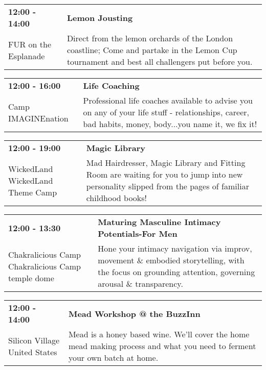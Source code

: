 \begin{tabular}{ p{1in} p{2.2in} }
    \textbf{12:00 - 14:00} & \textbf{Lemon Jousting} \\
    FUR \newline 6.45 on the Esplanade & Direct from the lemon orchards of the London coastline;  Come and partake in the Lemon Cup tournament and best all challengers put before you. \\
    \hline 
\end{tabular}
    
\begin{tabular}{ p{1in} p{2.2in} }
    \textbf{12:00 - 16:00} & \textbf{Life Coaching} \\
    Camp IMAGINEnation \newline  & Professional life coaches available to advise you on any of your life stuff - relationships, career, bad habits, money, body...you name it, we fix it! \\
    \hline 
\end{tabular}
    
\begin{tabular}{ p{1in} p{2.2in} }
    \textbf{12:00 - 19:00} & \textbf{Magic Library} \\
    WickedLand \newline WickedLand Theme Camp & Mad Hairdresser, Magic Library and Fitting Room are waiting for you to jump into new personality slipped from the pages of familiar childhood books! \\
    \hline 
\end{tabular}
    
\begin{tabular}{ p{1in} p{2.2in} }
    \textbf{12:00 - 13:30} & \textbf{Maturing Masculine Intimacy Potentials-For Men } \\
    Chakralicious Camp \newline Chakralicious Camp temple dome & Hone your intimacy navigation via improv, movement \& embodied storytelling, with the focus on grounding attention, governing arousal \& transparency. \\
    \hline 
\end{tabular}
    
\begin{tabular}{ p{1in} p{2.2in} }
    \textbf{12:00 - 14:00} & \textbf{Mead Workshop @ the BuzzInn} \\
    Silicon Village \newline United States & Mead is a honey based wine. We'll cover the home mead making process and what you need to ferment your own batch at home. \\
    \hline 
\end{tabular}
    
